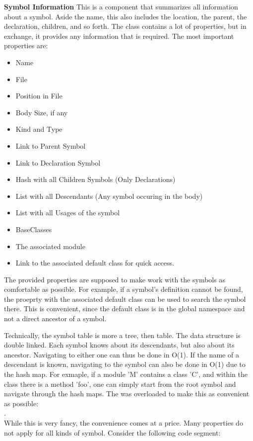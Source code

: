 \textbf{Symbol Information}
This is a component that summarizes all information about a symbol. Aside the name, this also includes the location, the parent, the declaration, children, and so forth. The class contains a lot of properties, but in exchange, it provides any information that is required. The most important properties are:
\begin{itemize}
    \item Name
    \item File
    \item Position in File
    \item Body Size, if any
    \item Kind and Type
    \item Link to Parent Symbol
    \item Link to Declaration Symbol
    \item Hash with all Children Symbols (Only Declarations)
    \item List with all Descendants (Any symbol occuring in the body)
    \item List with all Usages of the symbol
    \item BaseClasses
    \item The associated module
    \item Link to the associated default class for quick access.
\end{itemize}
The provided properties are supposed to make work with the symbols as comfortable as possible. For example, if a symbol's definition cannot be found, the proeprty with the associated default class can be used to search the symbol there. This is convenient, since the default class is in the global namespace and not a direct ancestor of a symbol.

Technically, the symbol table is more a tree, then table. The data structure is double linked. Each symbol knows about its descendants, but also about its ancestor. Navigating to either one can thus be done in O(1). If the name of a descendant is known, navigating to the symbol can also be done in O(1) due to the hash map. For exmaple, if a module 'M' contains a class 'C', and within the class there is a method 'foo', one can simply start from the root symbol and navigate through the hash maps. The \code{[]} was overloaded to make this as convenient as possible:\\
.\\

While this is very fancy, the convenience comes at a price. Many properties do not apply for all kinds of symbol. Consider the following code segment:

